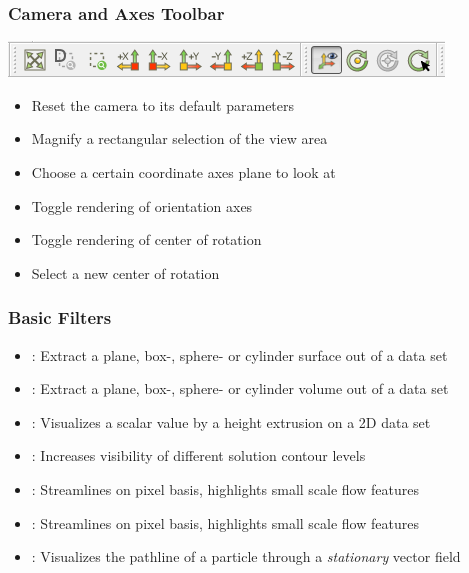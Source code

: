 \begin{frame}
  \frametitle{Camera and Axes Toolbar}

  \includegraphics[width=\textwidth]{screenshots/camerabar.png}

    \begin{itemize}
      \item Reset the camera to its default parameters
      \item Magnify a rectangular selection of the view area
      \item Choose a certain coordinate axes plane to look at
      \item Toggle rendering of orientation axes 
      \item Toggle rendering of center of rotation 
      \item Select a new center of rotation 
    \end{itemize}
\end{frame}



\begin{frame}
  \frametitle{Basic Filters}

    \begin{itemize}
      \item {}: Extract a plane, box-, sphere- or cylinder surface out of a data set
      \item {}: Extract a plane, box-, sphere- or cylinder volume out of a data set
      \item {}: Visualizes a scalar value by a height extrusion on a 2D data set 
      \item {}: Increases visibility of different solution contour levels 
      \item {}: Streamlines on pixel basis, highlights small scale flow features 
      \item {}: Streamlines on pixel basis, highlights small scale flow features 

      \item {}: Visualizes the pathline of a particle through a \emph{stationary} vector field 
    \end{itemize}

\end{frame}

